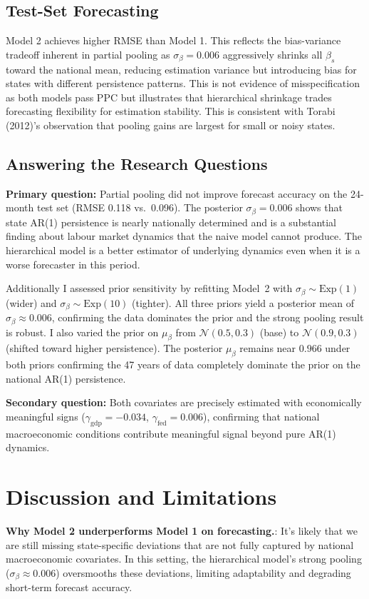 \documentclass[10pt]{article}
\begin{document}
\subsection{Test-Set Forecasting}
Model 2 achieves higher RMSE than Model 1.
This reflects the bias-variance tradeoff inherent in partial pooling as
$\sigma_\beta=0.006$ aggressively shrinks all $\beta_s$ toward the
national mean, reducing estimation variance but introducing bias for
states with different persistence patterns. This is not evidence of misspecification as both models pass PPC
but illustrates that hierarchical shrinkage trades forecasting
flexibility for estimation stability. This is consistent with Torabi (2012)'s
observation that pooling gains are largest for small or noisy states.

\subsection{Answering the Research Questions}

\textbf{Primary question:} Partial pooling did not improve forecast
accuracy on the 24-month test set (RMSE 0.118 vs.\ 0.096). The posterior
$\sigma_\beta = 0.006$ shows that state AR(1) persistence is nearly nationally
determined and is a substantial finding about labour market dynamics that the naive
model cannot produce. The hierarchical model is a better estimator of
underlying dynamics even when it is a worse forecaster in this period.

Additionally I assessed prior sensitivity by refitting Model~2 with $\sigma_\beta \sim \mathrm{Exp}(1)$
(wider) and $\sigma_\beta \sim \mathrm{Exp}(10)$ (tighter). All three priors yield
a posterior mean of $\sigma_\beta \approx 0.006$, confirming the data dominates
the prior and the strong pooling result is robust. I also varied the prior on
$\mu_\beta$ from $\mathcal{N}(0.5, 0.3)$ (base) to $\mathcal{N}(0.9, 0.3)$ (shifted toward higher
persistence). The posterior $\mu_\beta$ remains near $0.966$ under
both priors confirming the 47 years of
data completely dominate the prior on the national AR(1) persistence.


\textbf{Secondary question:} Both covariates are precisely estimated with
economically meaningful signs ($\gamma_{\mathrm{gdp}} = -0.034$, $\gamma_{\mathrm{fed}} = 0.006$), confirming that national macroeconomic conditions contribute meaningful
signal beyond pure AR(1) dynamics.

\section{Discussion and Limitations}
\textbf{Why Model 2 underperforms Model 1 on forecasting.}: 
It's likely that we are still missing state-specific deviations 
that are not fully captured by national macroeconomic covariates. In this setting, 
the hierarchical model's strong pooling ($\sigma_{\beta} \approx 0.006$) oversmooths these deviations, 
limiting adaptability and degrading short-term forecast accuracy.
\end{document}
